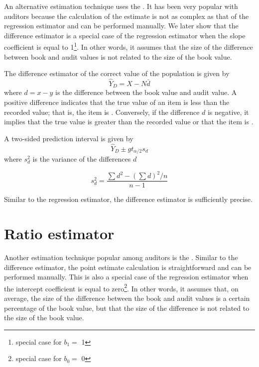 An alternative estimation technique uses the . It has been very popular with auditors because the calculation of the estimate is not as complex as that of the regression estimator and can be performed manually. We later show that the difference estimator is a special case of the regression estimator when the slope coefficient is equal to 1\footnote{special case for $b_1 = $ 1}. In other words, it assumes that the size of the difference between book and audit values is not related to the size of the book value.

\bigskip
The difference estimator of the correct value of the population is given by
\begin{equation}
\hat{Y}_D = X - N \bar{d}
\label{eq:difference_estimate}
\end{equation}
where $d = x - y$ is the difference between the book value and audit value. A positive difference indicates that the true value of an item is less than the recorded value; that is, the item is . Conversely, if the difference $d$ is negative, it implies that the true value is greater than the recorded value or that the item is .

\bigskip
A two-sided prediction interval is given by
\begin{equation}
  \hat{Y}_D \pm g t_{\alpha/2} s_d
\end{equation}
where $s_d^2$ is the variance of the differences $d$

\begin{equation}
s_d^2 = \frac{\sum{d^2} - (\sum{d})^2/n}{n - 1}
\label{eq:sd_diff}
\end{equation}

\bigskip


Similar to the regression estimator, the difference estimator is sufficiently precise.


\section{Ratio estimator} %
\label{sec:ratio_estimator}

Another estimation technique popular among auditors is the . Similar to the difference estimator, the point estimate calculation is straightforward and can be performed manually. This is also a special case of the regression estimator when the intercept coefficient is equal to zero\footnote{special case for $b_0 = $ 0}. In other words, it assumes that, on average, the size of the difference between the book and audit values is a certain percentage of the book value, but that the size of the difference is not related to the size of the book value.

